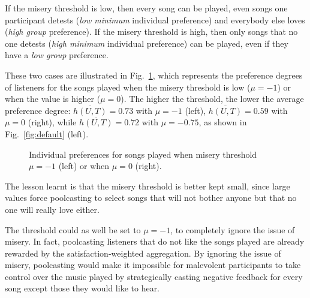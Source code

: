 If the misery threshold is low, then every song can be played, even songs one participant detests (\emph{low minimum} individual preference) and everybody else loves (\emph{high group} preference). 
If the misery threshold is high, then only songs that no one detests (\emph{high minimum} individual preference) can be played, even if they have a \emph{low group} preference.

These two cases are illustrated in Fig.~\ref{fig:misery}, which represents the preference degrees of listeners for the songs played when the misery threshold is low ($\mu = -1$) or when the value is higher ($\mu = 0$).
The higher the threshold, the lower the average preference degree: $\overline{h(U,T)} = 0.73$ with $\mu = -1$ (left), $\overline{h(U,T)} = 0.59$ with $\mu = 0$ (right), while $\overline{h(U,T)} = 0.72$ with $\mu = -0.75$, as shown in Fig.~\ref{fig:default} (left).
%
\begin{figure}[bthp]
\centering \setlength{\abovecaptionskip}{3pt}
\caption{Individual preferences for songs played when misery threshold $\mu = -1$ (left) or when $\mu = 0$ (right).}
\label{fig:misery}
\end{figure}

The lesson learnt is that the misery threshold is better kept small, since large values force poolcasting to select songs that will not bother anyone but that no one will really love either.

The threshold could as well be set to $\mu = -1$, to completely ignore the issue of misery. In fact, poolcasting listeners that do not like the songs played are already rewarded by the satisfaction-weighted aggregation.
By ignoring the issue of misery, poolcasting would make it impossible for malevolent participants to take control over the music played by strategically casting negative feedback for every song except those they would like to hear.




